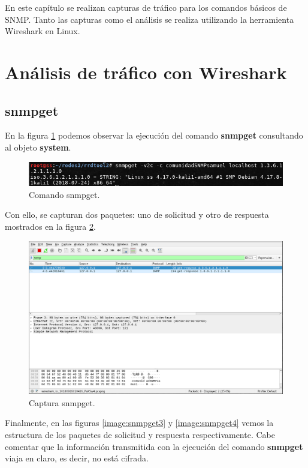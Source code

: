 En este capítulo se realizan capturas de tráfico para los comandos básicos de SNMP. Tanto las capturas como el análisis se realiza utilizando la herramienta Wireshark en Linux.
\section{Análisis de tráfico con Wireshark}
\subsection{snmpget}

En la figura \ref{image:snmpget1} podemos observar la ejecución del comando \textbf{snmpget} consultando al objeto \textbf{system}.

\FloatBarrier
\begin{figure}[htbp!]
		\centering
			\includegraphics[width=.9 \textwidth]{images/snmpget1}
		\caption{Comando snmpget.}
		\label{image:snmpget1}
\end{figure}
\FloatBarrier

Con ello, se capturan dos paquetes: uno de solicitud y otro de respuesta mostrados en la figura \ref{image:snmpget2}.

\FloatBarrier
\begin{figure}[htbp!]
		\centering
			\includegraphics[width=.9 \textwidth]{images/snmpget2}
		\caption{Captura snmpget.}
		\label{image:snmpget2}
\end{figure}
\FloatBarrier

Finalmente, en las figuras \ref{image:snmpget3} y \ref{image:snmpget4} vemos la estructura de los paquetes de solicitud y respuesta respectivamente. Cabe comentar que la información transmitida con la ejecución del comando \textbf{snmpget} viaja en claro, es decir, no está cifrada.

